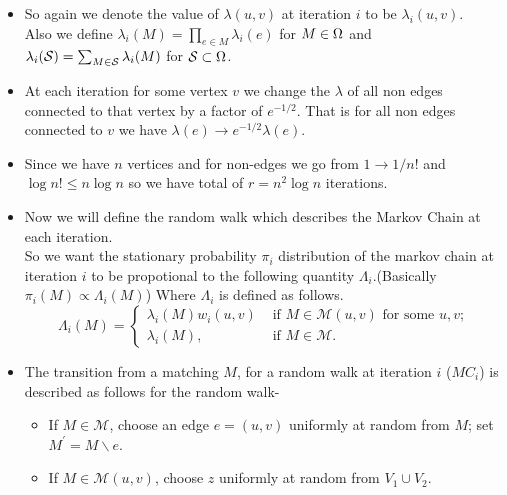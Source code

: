 \begin{itemize}
\item \begin{flushleft}
So again we denote the value of $\lambda(u,v)$ at iteration $i$ to be $\lambda_i(u,v)$.\\
Also we define $\lambda_i(M)= \prod_{e \in M} \lambda_i(e)$ for $M \in \Omega$ and $\lambda_i(\mathcal{S})=\sum_{M \in \mathcal{S}} \lambda_i(M)$ for $\mathcal{S} \subset \Omega$. 
	
\end{flushleft}
\item \begin{flushleft}
	At each iteration for some vertex $v$ we change the $\lambda$ of all non edges connected to that vertex by a factor of $e^{-1/2}$. That is for all non edges connected to $v$ we have $\lambda(e) \rightarrow e^{-1/2}\lambda(e)$.
\end{flushleft}
\item \begin{flushleft}
	Since we have $n$ vertices and for non-edges we go from $1\rightarrow 1/n!$ and $\log{n!} \leq n\log{n}$ so we have total of $r=n^2 \log{n}$ iterations. 
\end{flushleft}
\item \begin{flushleft}
	Now we will define the random walk which describes the Markov Chain at each iteration.\\
	So we want the stationary probability $\pi_i$ distribution of the markov chain at iteration $i$ to be propotional to the following quantity $\Lambda_i$.(Basically $\pi_i(M) \propto \Lambda_i(M)$) Where $\Lambda_i$ is defined as follows. \\
	$$\Lambda_i(M)= \begin{cases}\lambda_i(M) w_i(u, v) & \text { if } M \in \mathcal{M}(u, v) \text { for some } u, v ; \\ \lambda_i(M), & \text { if } M \in \mathcal{M} .\end{cases}$$
\end{flushleft}
\item \begin{flushleft}
	The transition from a matching $M$, for a random walk at iteration $i$ ($MC_i$) is described as follows for the random walk-\\
	\begin{itemize}
		\item If $M \in \mathcal{M}$, choose an edge $e=(u, v)$ uniformly at random from $M$; set $M^{\prime}=M \backslash e$.
		\item If $M \in \mathcal{M}(u, v)$, choose $z$ uniformly at random from $V_1 \cup V_2$.
		\begin{itemize}
			

\end{itemize}
\end{itemize}
\end{flushleft}
\end{itemize}
